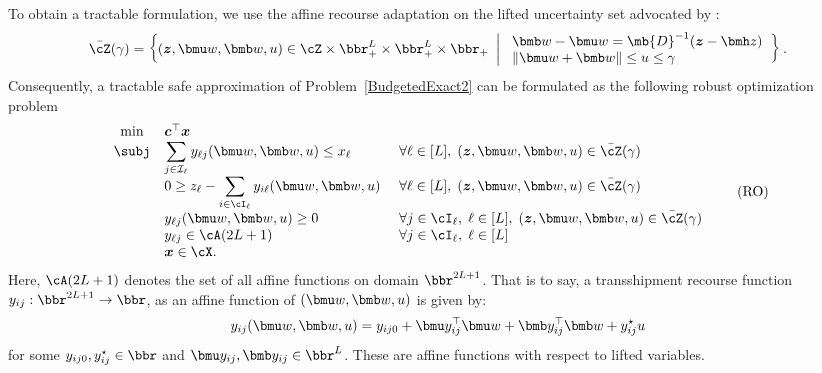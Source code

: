 \documentclass[opre, blindrev]{informs4}
\newcommand{\1}[1]{\mathds{1}{\left(#1\right)}}
\begin{document}
To obtain a tractable formulation, we use the affine recourse adaptation on the lifted uncertainty set advocated by \cite{chen2023occam}:
$$
\bar \cZ(\gamma) = \left\{({\bm z}, \bmu w, \bmb w, u) \in \cZ \times \bbr^L_+ \times \bbr^L_+ \times \bbr_+  ~\left|~ 
\begin{array}{l}
\bmb w - \bmu w = \mb{D}^{-1} (\bm z - \bmh  z) \\
\|\bmu w + \bmb w\|\leq u \leq \gamma 
\end{array}
\right.
\right\}.
$$
Consequently, a tractable safe approximation of Problem~\eqref{BudgetedExact2} can be formulated as the following robust optimization problem
\begin{equation} \label{prob:Budgeted_Allocation_Problem}
\begin{array}{cll}
\min &  \bm c^\top \bm x \\
     \subj 
     & \displaystyle \sum_{j \in \mathcal{I}_\ell} y_{\ell j}(\bmu w,\bmb w, u) \leq x_\ell &~ \forall \ell \in [L],\; (\bm z, \bmu w, \bmb w,u) \in \bar \cZ(\gamma)\\
     & \displaystyle 0\geq z_{\ell} - \sum_{i \in \cI_\ell} y_{i \ell}(\bmu w, \bmb w, u) &~ \forall \ell \in [L],\; (\bm z, \bmu w, \bmb w, u) \in \bar \cZ(\gamma) \\
     & \displaystyle y_{\ell j}(\bmu w, \bmb w, u) \geq 0 &~ \forall  j \in \cI_\ell,\; \ell \in [L],\; (\bm z, \bmu w, \bmb w, u) \in \bar \cZ(\gamma) \\
     & \displaystyle y_{\ell j}\in \cA(2L+1) &~ \forall  j \in \cI_\ell,\; \ell \in [L] \\
     &  {\bm x} \in \cX.
\end{array}
\tag{RO}
\end{equation}
Here, $\cA(2L+1)$ denotes the set of all affine functions on domain $\bbr^{2L+1}$. That is to say, a transshipment recourse function $y_{ij}:\bbr^{2L+1} \rightarrow \bbr$, as an affine function of $(\bmu w, \bmb w, u)$ is given by:
$$
y_{ij} (\bmu w, \bmb w, u) = y_{ij0}  + \bmu y_{ij}^\top \bmu w + \bmb y_{ij}^\top \bmb w + y_{ij}^\star u
$$
for some $y_{ij0}, y_{ij}^\star \in \bbr$ and $\bmu y_{ij}, \bmb y_{ij} \in \bbr^L$. 
These are affine functions with respect to lifted variables. 
\end{document}
